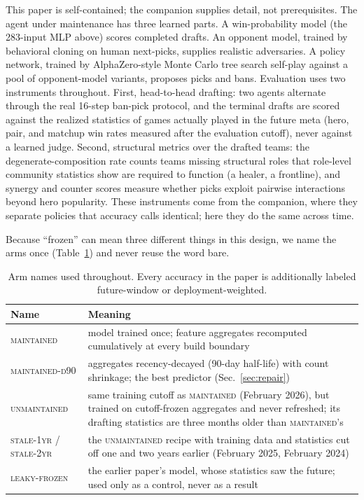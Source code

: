 \documentclass[journal]{IEEEtran}
\newcommand{\maintained}{\textsc{maintained}}          %
\newcommand{\maintainedpred}{\textsc{maintained-d90}}  %
\newcommand{\stalefour}{\textsc{unmaintained}}
\newcommand{\staleone}{\textsc{stale-1yr}}
\newcommand{\staletwo}{\textsc{stale-2yr}}
\newcommand{\leakyfrozen}{\textsc{leaky-frozen}}
\begin{document}
This paper is self-contained; the companion supplies detail, not
prerequisites. The agent under maintenance has three learned parts. A
win-probability model (the 283-input MLP above) scores completed drafts.
An opponent model, trained by behavioral cloning on human next-picks,
supplies realistic adversaries. A policy network, trained by
AlphaZero-style Monte Carlo tree search self-play against a pool of
opponent-model variants, proposes picks and bans. Evaluation uses two
instruments throughout. First, head-to-head drafting: two agents
alternate through the real 16-step ban-pick protocol, and the terminal
drafts are scored against the realized statistics of games actually
played in the future meta (hero, pair, and matchup win rates measured
after the evaluation cutoff), never against a learned judge. Second,
structural metrics over the drafted teams: the degenerate-composition
rate counts teams missing structural roles that role-level community
statistics show are required to function (a healer, a frontline), and
synergy and counter scores measure whether picks exploit pairwise
interactions beyond hero popularity. These instruments come from the
companion, where they separate policies that accuracy calls identical;
here they do the same across time.

Because ``frozen'' can mean three different things in this design, we
name the arms once (Table~\ref{tab:names}) and never reuse the word
bare.

\begin{table}[t]
\caption{Arm names used throughout. Every accuracy in the paper is
additionally labeled future-window or deployment-weighted.}
\label{tab:names}
\centering
\small
\setlength{\tabcolsep}{4pt}
\begin{tabular}{@{}p{}p{}@{}}
\toprule
Name & Meaning \\
\midrule
\maintained{} & model trained once; feature aggregates recomputed cumulatively at every build boundary \\
\maintainedpred{} & aggregates recency-decayed (90-day half-life) with count shrinkage; the best predictor (Sec.~\ref{sec:repair}) \\
\stalefour{} & same training cutoff as \maintained{} (February 2026), but trained on cutoff-frozen aggregates and never refreshed; its drafting statistics are three months older than \maintained{}'s \\
\staleone{} / \staletwo{} & the \stalefour{} recipe with training data and statistics cut off one and two years earlier (February 2025, February 2024) \\
\leakyfrozen{} & the earlier paper's model, whose statistics saw the future; used only as a control, never as a result \\
\bottomrule
\end{tabular}
\end{table}
\end{document}

